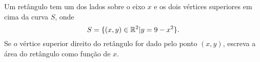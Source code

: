 Um retângulo tem um dos lados sobre o eixo $x$ e os dois vértices superiores em cima da curva $S$, onde
\[
	S=\{(x,y)\in\mathbb{R}^2|y=9-x^2\}.
\]
Se o vértice superior direito do retângulo for dado pelo ponto $(x,y)$, escreva a área do retângulo como função de $x$.
